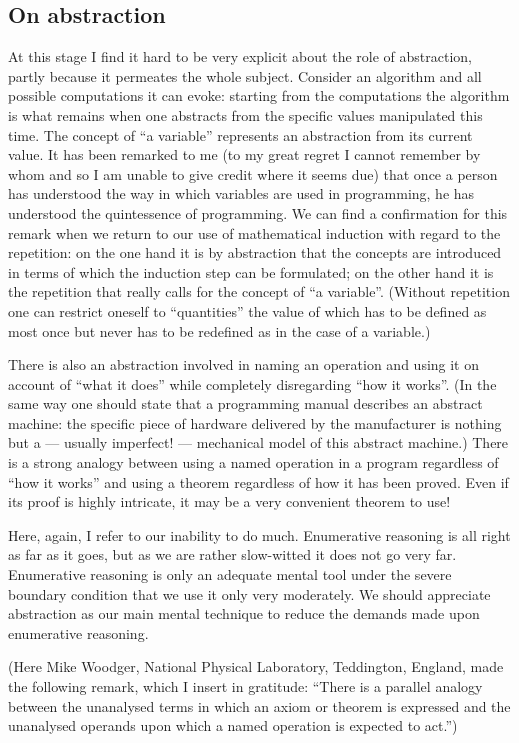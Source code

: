 \subsection{On abstraction}

At this stage I find it hard to be very explicit about the role of abstraction, partly because it permeates the whole subject. Consider an algorithm and all possible computations it can evoke: starting from the computations the algorithm is what remains when one abstracts from the specific values manipulated this time. The concept of ``a variable'' represents an abstraction from its current value. It has been remarked to me (to my great regret I cannot remember by whom and so I am unable to give credit where it seems due) that once a person has understood the way in which variables are used in programming, he has understood the quintessence of programming. We can find a confirmation for this remark when we return to our use of mathematical induction with regard to the repetition: on the one hand it is by abstraction that the concepts are introduced in terms of which the induction step can be formulated; on the other hand it is the repetition that really calls for the concept of ``a variable''. (Without repetition one can restrict oneself to ``quantities'' the value of which has to be defined as most once but never has to be redefined as in the case of a variable.)

There is also an abstraction involved in naming an operation and using it on account of ``what it does'' while completely disregarding ``how it works''. (In the same way one should state that a programming manual describes an abstract machine: the specific piece of hardware delivered by the manufacturer is nothing but a --- usually imperfect! --- mechanical model of this abstract machine.) There is a strong analogy between using a named operation in a program regardless of ``how it works'' and using a theorem regardless of how it has been proved. Even if its proof is highly intricate, it may be a very convenient theorem to use!

Here, again, I refer to our inability to do much. Enumerative reasoning is all right as far as it goes, but as we are rather slow-witted it does not go very
far. Enumerative reasoning is only an adequate mental tool under the severe boundary condition that we use it only very moderately. We should appreciate
abstraction as our main mental technique to reduce the demands made upon enumerative reasoning.

(Here Mike Woodger, National Physical Laboratory, Teddington, England, made the following remark, which I insert in gratitude: ``There is a parallel analogy between the unanalysed terms in which an axiom or theorem is expressed and the unanalysed operands upon which a named operation is expected to act.'')

